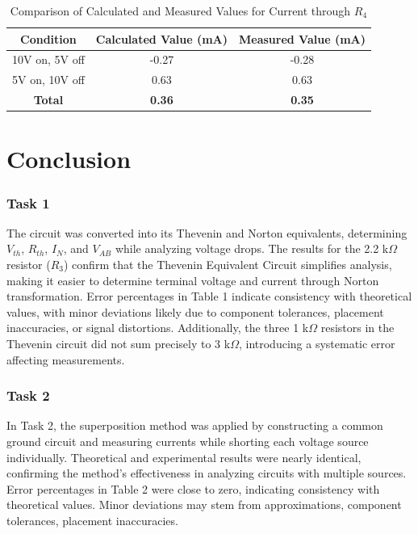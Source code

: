 \documentclass{article}
\begin{document}
\begin{table}[h!]
  \centering
  \begin{tabular}{|c|c|c|}
  \hline
  \textbf{Condition}        & \textbf{Calculated Value (mA)} & \textbf{Measured Value (mA)} \\
  \hline
  10V on, 5V off           & -0.27                         & -0.28                        \\
  \hline
  5V on, 10V off           & 0.63                          & 0.63                         \\
  \hline
  \textbf{Total}           & \textbf{0.36}                 & \textbf{0.35}                \\
  \hline
  \end{tabular}
  \caption{Comparison of Calculated and Measured Values for Current through \(R_4\)}
  \label{tab:comparison}
\end{table}


\section{Conclusion}

\subsubsection{Task 1}
The circuit was converted into its Thevenin and Norton equivalents, determining $V_{th}$, $R_{th}$, $I_N$, and $V_{AB}$ while analyzing voltage drops. The results for the 2.2 k$\Omega$ resistor ($R_3$) confirm that the Thevenin Equivalent Circuit simplifies analysis, making it easier to determine terminal voltage and current through Norton transformation. Error percentages in Table 1 indicate consistency with theoretical values, with minor deviations likely due to component tolerances, placement inaccuracies, or signal distortions. Additionally, the three 1 k$\Omega$ resistors in the Thevenin circuit did not sum precisely to 3 k$\Omega$, introducing a systematic error affecting measurements.

\subsubsection{Task 2}
In Task 2, the superposition method was applied by constructing a common ground circuit and measuring currents while shorting each voltage source individually. Theoretical and experimental results were nearly identical, confirming the method's effectiveness in analyzing circuits with multiple sources. Error percentages in Table 2 were close to zero, indicating consistency with theoretical values. Minor deviations may stem from approximations, component tolerances, placement inaccuracies.
\end{document}
